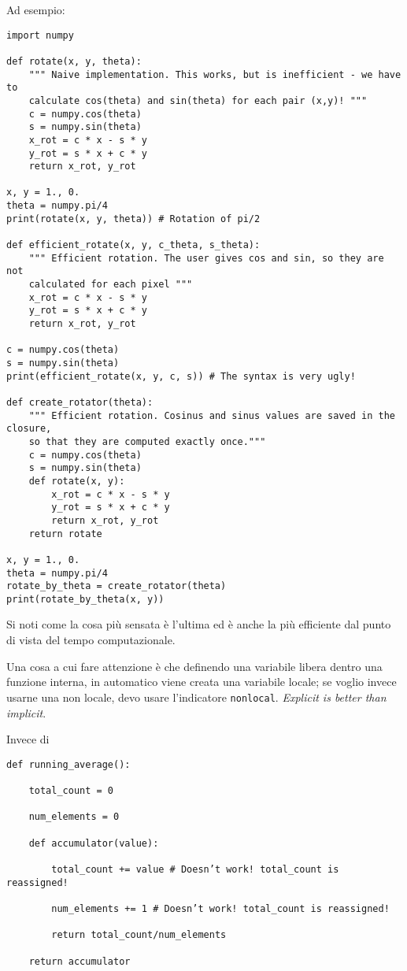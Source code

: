 \documentclass[10pt, a4paper, titlepage]{book}
\begin{document}
Ad esempio: 

\begin{verbatim}
import numpy

def rotate(x, y, theta):
	""" Naive implementation. This works, but is inefficient - we have to
	calculate cos(theta) and sin(theta) for each pair (x,y)! """
	c = numpy.cos(theta)
	s = numpy.sin(theta)
	x_rot = c * x - s * y
	y_rot = s * x + c * y
	return x_rot, y_rot

x, y = 1., 0.
theta = numpy.pi/4
print(rotate(x, y, theta)) # Rotation of pi/2

def efficient_rotate(x, y, c_theta, s_theta):
	""" Efficient rotation. The user gives cos and sin, so they are not
	calculated for each pixel """
	x_rot = c * x - s * y
	y_rot = s * x + c * y
	return x_rot, y_rot

c = numpy.cos(theta)
s = numpy.sin(theta)
print(efficient_rotate(x, y, c, s)) # The syntax is very ugly!

def create_rotator(theta):
	""" Efficient rotation. Cosinus and sinus values are saved in the closure,
	so that they are computed exactly once."""
	c = numpy.cos(theta)
	s = numpy.sin(theta)
	def rotate(x, y):
		x_rot = c * x - s * y
		y_rot = s * x + c * y
		return x_rot, y_rot
	return rotate

x, y = 1., 0.
theta = numpy.pi/4
rotate_by_theta = create_rotator(theta)
print(rotate_by_theta(x, y))
\end{verbatim}

Si noti come la cosa più sensata è l'ultima ed è anche la più efficiente dal punto di vista del tempo computazionale.

Una cosa a cui fare attenzione è che definendo una variabile libera dentro una funzione interna, in automatico viene creata una variabile locale; se voglio invece usarne una non locale, devo usare l'indicatore \texttt{nonlocal}. \textit{Explicit is better than implicit}.

Invece di 
\begin{verbatim}
def running_average():

	total_count = 0

	num_elements = 0

	def accumulator(value):

		total_count += value # Doesn’t work! total_count is reassigned!

		num_elements += 1 # Doesn’t work! total_count is reassigned!

		return total_count/num_elements

	return accumulator
\end{verbatim}
\end{document}
